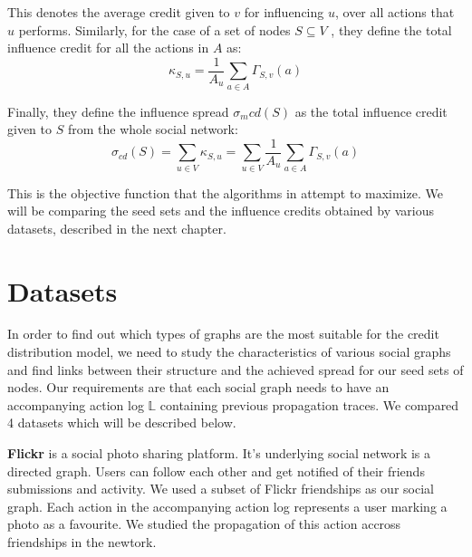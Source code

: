 \documentclass{acm_proc_article-sp}
\begin{document}
\noindent This denotes the average credit given to $v$ for influencing $u$, over all actions that $u$ performs. Similarly, for the case of a set of nodes $S \subseteq V$ , they define the total influence credit for all the actions in $A$ as:
\begin{equation}
		\kappa_{S,u} = \frac{1}{A_u} \displaystyle\sum_{a \in A} \Gamma_{S,v}(a)
\end{equation}

\noindent Finally, they define the influence spread $\sigma_m{cd}(S)$ as the total influence credit given to $S$ from the whole social network:
\begin{equation}
	\sigma_{cd}(S) = \displaystyle\sum_{u\in V} \kappa_{S,u} = \displaystyle\sum_{u\in V} \frac{1}{A_u} \displaystyle\sum_{a \in A} \Gamma_{S,v}(a)
\end{equation}

This is the objective function that the algorithms in \cite{goyal:datainfluence} attempt to maximize. We will be comparing the seed sets and the influence credits obtained by various datasets, described in the next chapter.



\section{Datasets}

In order to find out which types of graphs are the most suitable for the credit distribution model, we need to study the characteristics of various social graphs and find links between their structure and the achieved spread for our seed sets of nodes. Our requirements are that each social graph needs to have an accompanying action log $\mathbb{L}$ containing previous propagation traces. We compared 4 datasets which will be described below.

\textbf{Flickr} \cite{data:flickr} is a social photo sharing platform. It's underlying social network is a directed graph. Users can follow each other and get notified of their friends submissions and activity. We used a subset of Flickr friendships as our social graph. Each action in the accompanying action log represents a user marking a photo as a favourite. We studied the propagation of this action accross friendships in the newtork. \cite{data:flickr-paper}
\end{document}
